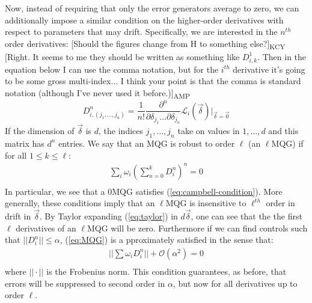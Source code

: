 \documentclass[aps,nofootinbib,pra,notitlepage,twocolumn]{revtex4-1}
\newcommand{\kcy}[1]{{\color{red}[#1]\textsubscript{\rm{KCY}}}}
\newcommand{\amp}[1]{{\color{red}[#1]\textsubscript{\rm{AMP}}}}
\begin{document}
Now, instead of requiring that only the error generators average to zero, we can additionally impose a similar condition on the higher-order derivatives with respect to parameters that may drift. Specifically, we are interested in the $n^{th}$ order derivatives:
\kcy{Should the figures change from H to something else?}
\amp{Right. It seems to me they should be written as something like $D^1_{i,k}$. Then in the equation below I can use the comma notation, but for the $i^{th}$ derivative it's going to be some gross multi-index... I think your point is that the comma is standard notation (although I've never used it before.)}
\begin{equation}
\label{eq:derivative}
D^n_{i, (j_1, \ldots, j_n)} = \frac{1}{n!}\frac{\partial^{n}}{\partial\delta_{j_1}\ldots\partial\delta_{j_n}}\mathcal{L}_i(\vec{\delta})|_{\vec{\delta}=\vec{0}}
\end{equation}
If the dimension of $\vec{\delta}$ is $d$, the indices $j_1, \ldots, j_n$ take on values in $1, \ldots, d$ and this matrix has $d^n$ entries. 
We say that an MQG is robust to order $\ell$ (an $\ell$MQG) if for all $1 \leq k \leq \ell$:
\begin{equation}\label{eq:MQG}
\begin{gathered}
\sum_i\omega_i(\sum_{n=0}^k D^n_i)^n = 0\\
\end{gathered}
\end{equation}
In particular, we see that a 0MQG satisfies (\ref{eq:campbell-condition}). More generally, these conditions imply that an $\ell$MQG is insensitive to $\ell^{th}$ order in drift in $\vec{\delta}$. 
By Taylor expanding (\ref{eq:taylor}) in $d\vec{\delta}$, one can see that the the first $\ell$ derivatives of an $\ell$MQG will be zero. Furthermore if we can find controls such that $||D_i^n||\leq\alpha$, (\ref{eq:MQG}) is a pproximately satisfied in the sense that:
\begin{equation}\label{eq:MQG-relaxed}
\begin{gathered}
||\sum\omega_iD^n_i||+ \mathcal{O}(\alpha^2) = 0\\
\end{gathered}
\end{equation}
where $||\cdot||$ is the Frobenius norm. This condition guarantees, as before, that errors will be suppressed to second order in $\alpha$, but now for all derivatives up to order $\ell$. %
\end{document}
